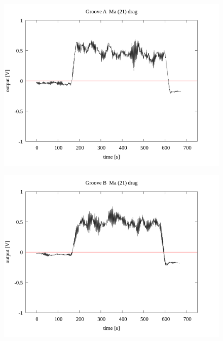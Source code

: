 \documentclass[a4paper]{jsarticle}
\begin{document}
\begin{figure}[htbp]
    \footnotesize
    \begin{center}
        \includegraphics[width=140mm]{../../../33_result/210806/moving_average/21/drag/Groove_A_ma(21)_drag.png}
    \end{center}
\end{figure}

\begin{figure}[htbp]
    \footnotesize
    \begin{center}
        \includegraphics[width=140mm]{../../../33_result/210806/moving_average/21/drag/Groove_B_ma(21)_drag.png}
    \end{center}
\end{figure}
\end{document}
